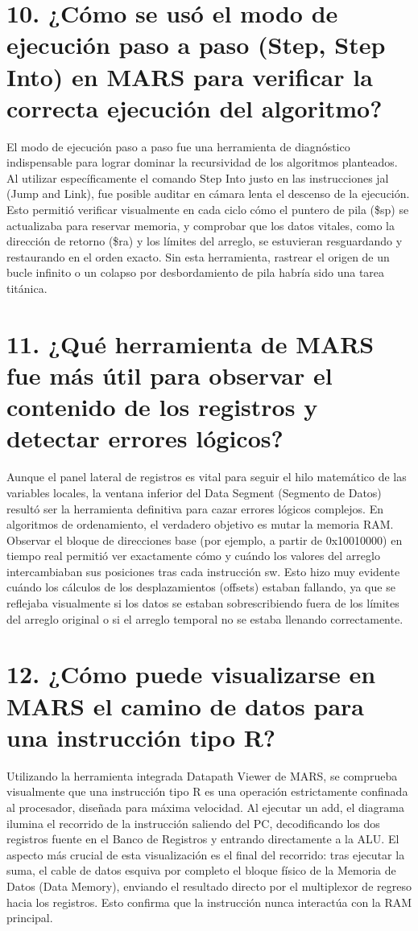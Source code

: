 \documentclass[12pt,a4paper]{article}
\begin{document}
\section*{10. ¿Cómo se usó el modo de ejecución paso a paso (Step, Step Into) en MARS para verificar la correcta ejecución del algoritmo?}
El modo de ejecución paso a paso fue una herramienta de diagnóstico indispensable para lograr dominar la recursividad de los algoritmos planteados. Al utilizar específicamente el comando Step Into justo en las instrucciones jal (Jump and Link), fue posible auditar en cámara lenta el descenso de la ejecución. Esto permitió verificar visualmente en cada ciclo cómo el puntero de pila (\$sp) se actualizaba para reservar memoria, y comprobar que los datos vitales, como la dirección de retorno (\$ra) y los límites del arreglo, se estuvieran resguardando y restaurando en el orden exacto. Sin esta herramienta, rastrear el origen de un bucle infinito o un colapso por desbordamiento de pila habría sido una tarea titánica.

\section*{11. ¿Qué herramienta de MARS fue más útil para observar el contenido de los registros y detectar errores lógicos?}
Aunque el panel lateral de registros es vital para seguir el hilo matemático de las variables locales, la ventana inferior del Data Segment (Segmento de Datos) resultó ser la herramienta definitiva para cazar errores lógicos complejos. En algoritmos de ordenamiento, el verdadero objetivo es mutar la memoria RAM. Observar el bloque de direcciones base (por ejemplo, a partir de 0x10010000) en tiempo real permitió ver exactamente cómo y cuándo los valores del arreglo intercambiaban sus posiciones tras cada instrucción sw. Esto hizo muy evidente cuándo los cálculos de los desplazamientos (offsets) estaban fallando, ya que se reflejaba visualmente si los datos se estaban sobrescribiendo fuera de los límites del arreglo original o si el arreglo temporal no se estaba llenando correctamente.

\section*{12. ¿Cómo puede visualizarse en MARS el camino de datos para una instrucción tipo R?}
Utilizando la herramienta integrada Datapath Viewer de MARS, se comprueba visualmente que una instrucción tipo R es una operación estrictamente confinada al procesador, diseñada para máxima velocidad. Al ejecutar un add, el diagrama ilumina el recorrido de la instrucción saliendo del PC, decodificando los dos registros fuente en el Banco de Registros y entrando directamente a la ALU. El aspecto más crucial de esta visualización es el final del recorrido: tras ejecutar la suma, el cable de datos esquiva por completo el bloque físico de la Memoria de Datos (Data Memory), enviando el resultado directo por el multiplexor de regreso hacia los registros. Esto confirma que la instrucción nunca interactúa con la RAM principal.
\end{document}
